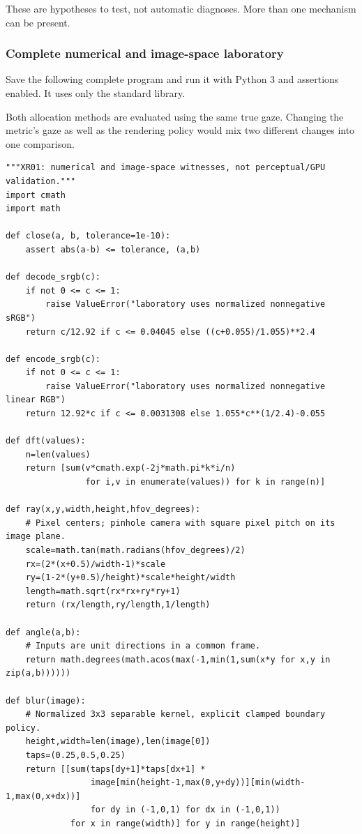 These are hypotheses to test, not automatic diagnoses. More than one mechanism can be present.

\subsubsection{Complete numerical and image-space laboratory}\label{04-visual-computing-ii-ch043-complete-numerical-and-image-space-laboratory}

Save the following complete program and run it with Python 3 and assertions enabled. It uses only the standard library.

Both allocation methods are evaluated using the same true gaze. Changing the metric's gaze as well as the rendering policy would mix two different changes into one comparison.

\begin{verbatim}
"""XR01: numerical and image-space witnesses, not perceptual/GPU validation."""
import cmath
import math

def close(a, b, tolerance=1e-10):
    assert abs(a-b) <= tolerance, (a,b)

def decode_srgb(c):
    if not 0 <= c <= 1:
        raise ValueError("laboratory uses normalized nonnegative sRGB")
    return c/12.92 if c <= 0.04045 else ((c+0.055)/1.055)**2.4

def encode_srgb(c):
    if not 0 <= c <= 1:
        raise ValueError("laboratory uses normalized nonnegative linear RGB")
    return 12.92*c if c <= 0.0031308 else 1.055*c**(1/2.4)-0.055

def dft(values):
    n=len(values)
    return [sum(v*cmath.exp(-2j*math.pi*k*i/n)
                for i,v in enumerate(values)) for k in range(n)]

def ray(x,y,width,height,hfov_degrees):
    # Pixel centers; pinhole camera with square pixel pitch on its image plane.
    scale=math.tan(math.radians(hfov_degrees)/2)
    rx=(2*(x+0.5)/width-1)*scale
    ry=(1-2*(y+0.5)/height)*scale*height/width
    length=math.sqrt(rx*rx+ry*ry+1)
    return (rx/length,ry/length,1/length)

def angle(a,b):
    # Inputs are unit directions in a common frame.
    return math.degrees(math.acos(max(-1,min(1,sum(x*y for x,y in zip(a,b))))))

def blur(image):
    # Normalized 3x3 separable kernel, explicit clamped boundary policy.
    height,width=len(image),len(image[0])
    taps=(0.25,0.5,0.25)
    return [[sum(taps[dy+1]*taps[dx+1] *
                 image[min(height-1,max(0,y+dy))][min(width-1,max(0,x+dx))]
                 for dy in (-1,0,1) for dx in (-1,0,1))
             for x in range(width)] for y in range(height)]


\end{verbatim}
